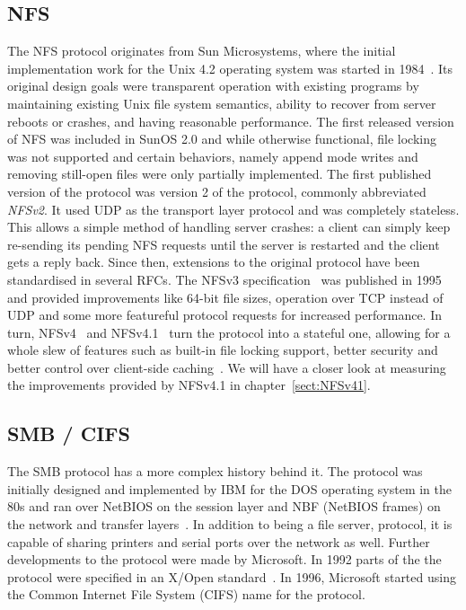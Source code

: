 \subsection{NFS}

The NFS protocol originates from Sun Microsystems, where the initial implementation work for the
Unix 4.2 operating system was started in 1984~\cite{NFS}. Its original design goals were
transparent operation with existing programs by maintaining existing Unix file system
semantics, ability to recover from server reboots or crashes, and having reasonable
performance.
The first released version of NFS was included in SunOS 2.0
and while otherwise functional,
file locking was not supported and certain behaviors,
namely append mode writes and removing still-open files were only partially implemented.
The first published version of the protocol was version 2 of the protocol, commonly abbreviated \emph{NFSv2}.
It used UDP as the transport layer protocol and was completely stateless.
This allows a simple method of handling server crashes: a client can simply keep re-sending
its pending NFS requests until the server is restarted and the client gets a reply back.
Since then, extensions to the original protocol have been standardised
in several RFCs.
The NFSv3 specification~\cite{NFSv3RFC} was published in 1995 and provided improvements
like 64-bit file sizes, operation over TCP instead of UDP and some more featureful protocol
requests for increased performance.
In turn, NFSv4~\cite{NFSv4RFC} and NFSv4.1~\cite{NFSv41RFC} turn the protocol into a stateful one,
allowing for a whole slew of features such as built-in file locking support, better security
and better control over client-side caching~\cite{NFSv4Better}.
We will have a closer look at measuring the improvements provided by NFSv4.1 in chapter~\ref{sect:NFSv41}.

\subsection{SMB / CIFS}

The SMB protocol has a more complex history behind it. The protocol was initially designed
and implemented by IBM for the DOS operating system in the 80s
and ran over NetBIOS on the session layer and NBF (NetBIOS frames) on the network and transfer layers~\cite{CifsBook}.
In addition to being a file server, protocol, it is capable of sharing printers and serial ports over the network as well.
Further developments to the protocol were made by Microsoft.
In 1992 parts of the the protocol were specified in an X/Open standard~\cite{XopenSmbSpec}.
In 1996, Microsoft started using the Common Internet File System (CIFS) name for the protocol.


